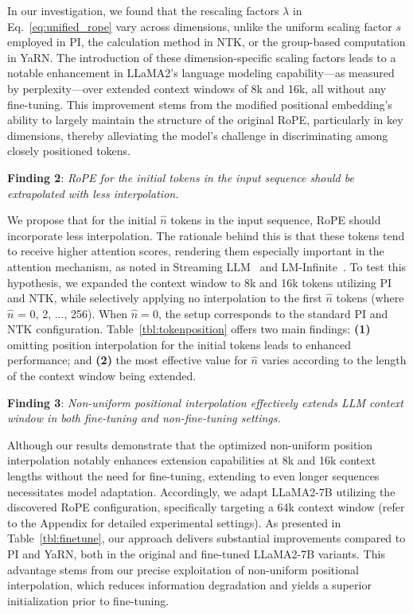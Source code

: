 In our investigation, we found that the rescaling factors $\lambda$ in Eq.~\ref{eq:unified_rope} vary across dimensions, unlike the uniform scaling factor $s$ employed in PI, the calculation method in NTK, or the group-based computation in YaRN. The introduction of these dimension-specific scaling factors leads to a notable enhancement in LLaMA2’s language modeling capability—as measured by perplexity—over extended context windows of 8k and 16k, all without any fine-tuning. This improvement stems from the modified positional embedding’s ability to largely maintain the structure of the original RoPE, particularly in key dimensions, thereby alleviating the model’s challenge in discriminating among closely positioned tokens.

\textbf{Finding 2}: \textit{RoPE for the initial tokens in the input sequence should be extrapolated with less interpolation.} 

We propose that for the initial $\hat{n}$ tokens in the input sequence, RoPE should incorporate less interpolation. The rationale behind this is that these tokens tend to receive higher attention scores, rendering them especially important in the attention mechanism, as noted in Streaming LLM~\cite{streamingllm} and LM-Infinite~\cite{han2023lminfinite}. To test this hypothesis, we expanded the context window to 8k and 16k tokens utilizing PI and NTK, while selectively applying no interpolation to the first $\hat n$ tokens (where $\hat n$ = 0, 2, ..., 256). When $\hat n=0$, the setup corresponds to the standard PI and NTK configuration. Table~\ref{tbl:tokenposition} offers two main findings: \textbf{(1)} omitting position interpolation for the initial tokens leads to enhanced performance; and \textbf{(2)} the most effective value for $\hat n$ varies according to the length of the context window being extended.

\textbf{Finding 3}: \textit{Non-uniform positional interpolation effectively extends LLM context window in both fine-tuning and non-fine-tuning settings.} 

Although our results demonstrate that the optimized non-uniform position interpolation notably enhances extension capabilities at 8k and 16k context lengths without the need for fine-tuning, extending to even longer sequences necessitates model adaptation. Accordingly, we adapt LLaMA2-7B utilizing the discovered RoPE configuration, specifically targeting a 64k context window (refer to the Appendix for detailed experimental settings). As presented in Table~\ref{tbl:finetune}, our approach delivers substantial improvements compared to PI and YaRN, both in the original and fine-tuned LLaMA2-7B variants. This advantage stems from our precise exploitation of non-uniform positional interpolation, which reduces information degradation and yields a superior initialization prior to fine-tuning.

